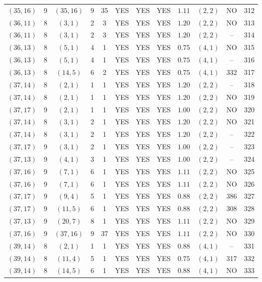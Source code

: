 \begin{longtable}{|c|c|c|c|c|c|c|c|c|c|c|c|}
$(35,16)$ & 9 & $(35,16)$ & 9 & 35 & YES & YES & YES & $1.11$ & $(2,2)$ & NO & 312\\
$(36,11)$ & 8 & $(3,1)$ & 2 & 3 & YES & YES & YES & $1.20$ & $(2,2)$ & NO & 313\\
$(36,11)$ & 8 & $(3,1)$ & 2 & 3 & YES & YES & YES & $1.20$ & $(2,2)$ & -- & 314\\
$(36,13)$ & 8 & $(5,1)$ & 4 & 1 & YES & YES & YES & $0.75$ & $(4,1)$ & NO & 315\\
$(36,13)$ & 8 & $(5,1)$ & 4 & 1 & YES & YES & YES & $0.75$ & $(4,1)$ & -- & 316\\
$(36,13)$ & 8 & $(14,5)$ & 6 & 2 & YES & YES & YES & $0.75$ & $(4,1)$ & 332 & 317\\
$(37,14)$ & 8 & $(2,1)$ & 1 & 1 & YES & YES & YES & $1.20$ & $(2,2)$ & -- & 318\\
$(37,14)$ & 8 & $(2,1)$ & 1 & 1 & YES & YES & YES & $1.20$ & $(2,2)$ & NO & 319\\
$(37,17)$ & 9 & $(2,1)$ & 1 & 1 & YES & YES & YES & $1.00$ & $(2,2)$ & NO & 320\\
$(37,14)$ & 8 & $(3,1)$ & 2 & 1 & YES & YES & YES & $1.20$ & $(2,2)$ & NO & 321\\
$(37,14)$ & 8 & $(3,1)$ & 2 & 1 & YES & YES & YES & $1.20$ & $(2,2)$ & -- & 322\\
$(37,17)$ & 9 & $(3,1)$ & 2 & 1 & YES & YES & YES & $1.00$ & $(2,2)$ & -- & 323\\
$(37,13)$ & 9 & $(4,1)$ & 3 & 1 & YES & YES & YES & $1.00$ & $(2,2)$ & -- & 324\\
$(37,16)$ & 9 & $(7,1)$ & 6 & 1 & YES & YES & YES & $1.11$ & $(2,2)$ & NO & 325\\
$(37,16)$ & 9 & $(7,1)$ & 6 & 1 & YES & YES & YES & $1.11$ & $(2,2)$ & NO & 326\\
$(37,17)$ & 9 & $(9,4)$ & 5 & 1 & YES & YES & YES & $0.88$ & $(2,2)$ & 386 & 327\\
$(37,17)$ & 9 & $(11,5)$ & 6 & 1 & YES & YES & YES & $0.88$ & $(2,2)$ & 308 & 328\\
$(37,13)$ & 9 & $(20,7)$ & 8 & 1 & YES & YES & YES & $1.11$ & $(2,2)$ & NO & 329\\
$(37,16)$ & 9 & $(37,16)$ & 9 & 37 & YES & YES & YES & $1.11$ & $(2,2)$ & NO & 330\\
$(39,14)$ & 8 & $(2,1)$ & 1 & 1 & YES & YES & YES & $0.88$ & $(4,1)$ & -- & 331\\
$(39,14)$ & 8 & $(11,4)$ & 5 & 1 & YES & YES & YES & $0.75$ & $(4,1)$ & 317 & 332\\
$(39,14)$ & 8 & $(14,5)$ & 6 & 1 & YES & YES & YES & $0.88$ & $(4,1)$ & NO & 333\\

\end{longtable}
